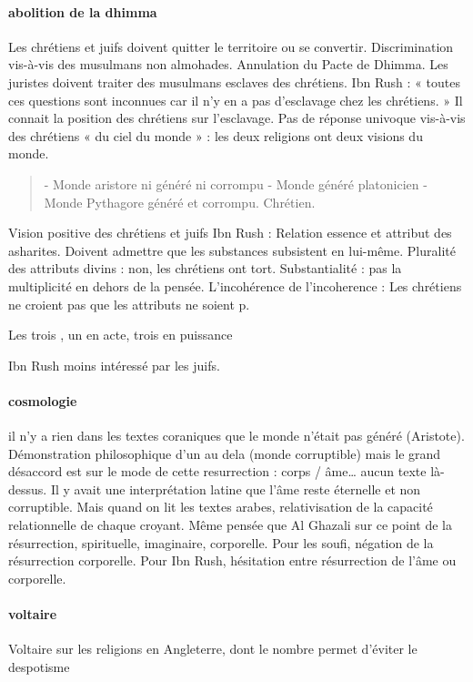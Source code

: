 \paragraph{abolition de la dhimma}
Les chrétiens et juifs doivent quitter le territoire ou se convertir. Discrimination vis-à-vis des musulmans non almohades.
Annulation du Pacte de Dhimma.
Les juristes doivent traiter des musulmans esclaves des chrétiens. Ibn Rush :
« toutes ces questions sont inconnues car il n’y en a pas d’esclavage chez les chrétiens. »
Il connait la position des chrétiens sur l’esclavage.  
Pas de réponse univoque vis-à-vis des chrétiens
« du ciel du monde » : les deux religions ont deux visions du monde. 
\begin{quote}
-	Monde aristore ni généré ni corrompu
-	Monde généré platonicien
-	Monde Pythagore généré et corrompu. Chrétien. 
\end{quote}
Vision positive des chrétiens et juifs
Ibn Rush : 
Relation essence et attribut des asharites. Doivent admettre que les substances subsistent en lui-même. Pluralité des attributs divins : non, les chrétiens ont tort. 
Substantialité : pas la multiplicité en dehors de la pensée. 
L’incohérence de l’incoherence : 
Les chrétiens ne croient pas que les attributs ne soient p. 

Les trois , un en acte, trois en puissance

Ibn Rush moins intéressé par les juifs. 

\paragraph{cosmologie} il n’y a rien dans les textes coraniques que le monde n’était pas généré (Aristote). Démonstration philosophique d’un au dela (monde corruptible) mais le grand désaccord est sur le mode de cette resurrection : corps / âme… aucun texte là-dessus. Il y avait une interprétation latine que l’âme reste éternelle et non corruptible. Mais quand on lit les textes arabes, relativisation de la capacité relationnelle de chaque croyant. Même pensée que Al Ghazali sur ce point de la résurrection, spirituelle, imaginaire, corporelle. Pour les soufi, négation de la résurrection corporelle. Pour Ibn Rush, hésitation entre résurrection de l’âme ou corporelle.  
\paragraph{voltaire}
Voltaire sur les religions en Angleterre, dont le nombre permet d’éviter le despotisme

